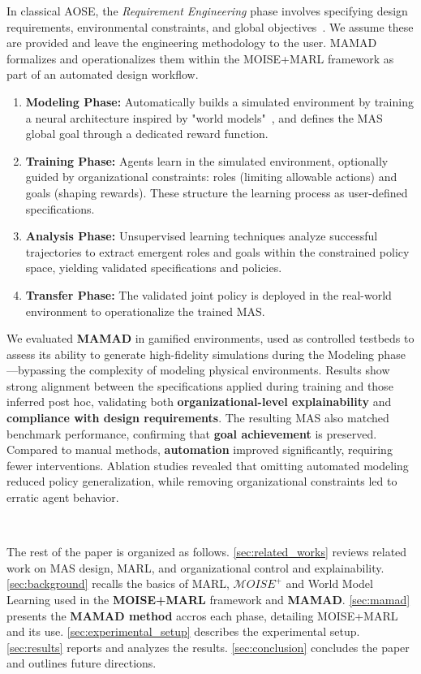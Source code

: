 \documentclass[pdflatex,sn-mathphys-num]{sn-jnl}%
\theoremstyle{thmstyleone}%
\theoremstyle{thmstyletwo}%
\theoremstyle{thmstylethree}%
\begin{document}
In classical AOSE, the \textit{Requirement Engineering} phase involves specifying design requirements, environmental constraints, and global objectives~\cite{Pavon2003, Bernon2005}. We assume these are provided and leave the engineering methodology to the user. MAMAD formalizes and operationalizes them within the MOISE+MARL framework as part of an automated design workflow.

\begin{enumerate}
    \item \textbf{Modeling Phase:} Automatically builds a simulated environment by training a neural architecture inspired by "world models"~\cite{Ha2018}, and defines the MAS global goal through a dedicated reward function.
    \item \textbf{Training Phase:} Agents learn in the simulated environment, optionally guided by organizational constraints: roles (limiting allowable actions) and goals (shaping rewards). These structure the learning process as user-defined specifications.
    \item \textbf{Analysis Phase:} Unsupervised learning techniques analyze successful trajectories to extract emergent roles and goals within the constrained policy space, yielding validated specifications and policies.
    \item \textbf{Transfer Phase:} The validated joint policy is deployed in the real-world environment to operationalize the trained MAS.
\end{enumerate}

We evaluated \textbf{MAMAD} in gamified environments, used as controlled testbeds to assess its ability to generate high-fidelity simulations during the Modeling phase—bypassing the complexity of modeling physical environments. Results show strong alignment between the specifications applied during training and those inferred post hoc, validating both \textbf{organizational-level explainability} and \textbf{compliance with design requirements}. The resulting MAS also matched benchmark performance, confirming that \textbf{goal achievement} is preserved. Compared to manual methods, \textbf{automation} improved significantly, requiring fewer interventions. Ablation studies revealed that omitting automated modeling reduced policy generalization, while removing organizational constraints led to erratic agent behavior.

\

The rest of the paper is organized as follows. \autoref{sec:related_works} reviews related work on MAS design, MARL, and organizational control and explainability. \autoref{sec:background} recalls the basics of MARL, $\mathcal{M}OISE^+$ and World Model Learning used in the \textbf{MOISE+MARL} framework and \textbf{MAMAD}. \autoref{sec:mamad} presents the \textbf{MAMAD method} accros each phase, detailing MOISE+MARL and its use. \autoref{sec:experimental_setup} describes the experimental setup. \autoref{sec:results} reports and analyzes the results. \autoref{sec:conclusion} concludes the paper and outlines future directions.
\end{document}
